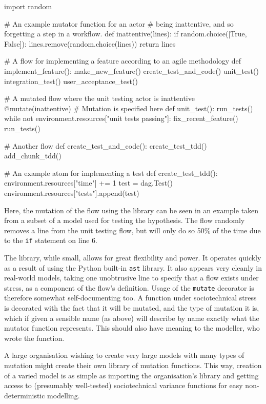 \begin{pyglist}[language = python, caption={Example use of the mutation library}, listingname=\textbf{Code sample} \comment{, fvset={frame=single,framerule=1pt}}, numbers=left]
import random

# An example mutator function for an actor
# being inattentive, and so forgetting a step in a workflow.
def inattentive(lines):
    if random.choice([True, False]):
    lines.remove(random.choice(lines))
    return lines

# A flow for implementing a feature according to an agile methodology
def implement_feature():
    make_new_feature()
    create_test_and_code()
    unit_test()
    integration_test()
    user_acceptance_test()

# A mutated flow where the unit testing actor is inattentive
@mutate(inattentive)  # Mutation is specified here
def unit_test():
    run_tests()
    while not environment.resources["unit tests passing"]:
        fix_recent_feature()
        run_tests()

# Another flow
def create_test_and_code():
    create_test_tdd()
    add_chunk_tdd()
    
# An example atom for implementing a test
def create_test_tdd():
    environment.resources["time"] += 1
    test = dag.Test()
    environment.resources["tests"].append(test)
\end{pyglist}

Here, the mutation of the flow using the library can be seen in an example taken from a subset of a model used for testing the hypothesis. The flow randomly removes a line from the unit testing flow, but will only do so 50\% of the time due to the \texttt{if} statement on line 6. \par

The library, while small, allows for great flexibility and power. It operates quickly as a result of using the Python built-in \texttt{ast} library. It also appears very cleanly in real-world models, taking one unobtrusive line to specify that a flow exists under stress, as a component of the flow's definition. Usage of the \texttt{mutate} decorator is therefore somewhat self-documenting too. A function under sociotechnical stress is decorated with the fact that it will be mutated, and the type of mutation it is, which if given a sensible name (as above) will describe by name exactly what the mutator function represents. This should also have meaning to the modeller, who wrote the function. \par

A large organisation wishing to create very large models with many types of mutation might create their own library of mutation functions. This way, creation of a varied model is as simple as importing the organisation's library and getting access to (presumably well-tested) sociotechnical variance functions for easy non-deterministic modelling. \par

